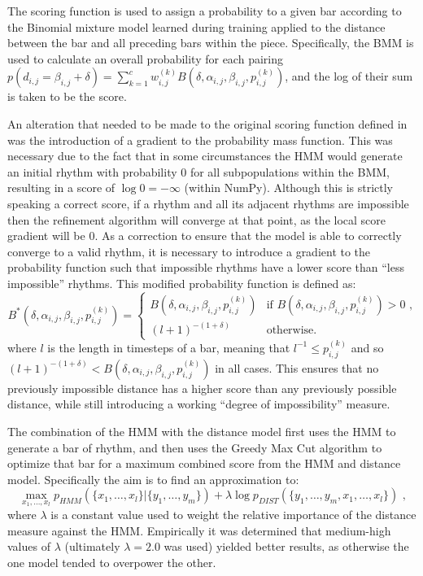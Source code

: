 \documentclass[ author={Stephen Livermore-Tozer},
				supervisor={Dr. Peter Flach},
				degree={MEng},
				title={Algorithmic Co-composition Using Machine Learning},
				subtitle={},
				type={research},
				year={2016} ]{dissertation}
\begin{document}
	The scoring function is used to assign a probability to a given bar according to the Binomial mixture model learned during training applied to the distance between the bar and all preceding bars within the piece. Specifically, the BMM is used to calculate an overall probability for each pairing $p(d_{i,j} = \beta_{i,j} + \delta) = \sum_{k=1}^{c} w_{i,j}^{(k)} B(\delta,\alpha_{i,j},\beta_{i,j},p_{i,j}^{(k)})$, and the log of their sum is taken to be the score.
	
	An alteration that needed to be made to the original scoring function defined in \cite{paiement2007generative} was the introduction of a gradient to the probability mass function. This was necessary due to the fact that in some circumstances the HMM would generate an initial rhythm with probability $0$ for all subpopulations within the BMM, resulting in a score of $\log 0 = -\infty$ (within NumPy). Although this is strictly speaking a correct score, if a rhythm and all its adjacent rhythms are impossible then the refinement algorithm will converge at that point, as the local score gradient will be $0$. As a correction to ensure that the model is able to correctly converge to a valid rhythm, it is necessary to introduce a gradient to the probability function such that impossible rhythms have a lower score than ``less impossible'' rhythms. This modified probability function is defined as:
	$$B^*(\delta,\alpha_{i,j},\beta_{i,j},p_{i,j}^{(k)}) =
	\begin{cases}
		B(\delta,\alpha_{i,j},\beta_{i,j},p_{i,j}^{(k)}) & \text{if } B(\delta,\alpha_{i,j},\beta_{i,j},p_{i,j}^{(k)}) > 0 \text{ ,} \\
		(l+1)^{-(1 + \delta)} & \text{otherwise.}
	\end{cases}$$
	where $l$ is the length in timesteps of a bar, meaning that $l^{-1} \leq p_{i,j}^{(k)}$ and so $(l+1)^{-(1 + \delta)} < B(\delta,\alpha_{i,j},\beta_{i,j},p_{i,j}^{(k)})$ in all cases. This ensures that no previously impossible distance has a higher score than any previously possible distance, while still introducing a working ``degree of impossibility'' measure. 
	
	The combination of the HMM with the distance model first uses the HMM to generate a bar of rhythm, and then uses the Greedy Max Cut algorithm \cite{rohde2002methods} to optimize that bar for a maximum combined score from the HMM and distance model. Specifically the aim is to find an approximation to:
	$$ \max_{x_1,\dots,x_l} p_{HMM}(\{x_1,\dots,x_l\} | \{y_1,\dots,y_m\}) + \lambda \log p_{DIST}(\{y_1,\dots,y_m,x_1,\dots,x_l\}) \text{ ,} $$
	where $\lambda$ is a constant value used to weight the relative importance of the distance measure against the HMM. Empirically it was determined that medium-high values of $\lambda$ (ultimately $\lambda = 2.0$ was used) yielded better results, as otherwise the one model tended to overpower the other.
	
\end{document}
